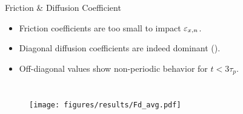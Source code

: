 \begin{frame}{Friction \& Diffusion Coefficient}
    \begin{itemize}
        \itemVspace
        \item Friction coefficients are too small to impact $\varepsilon_{x,n}$.
        \item Diagonal diffusion coefficients are indeed dominant (\cite{manheimer1997langevin}).
        \item Off-diagonal values show non-periodic behavior for $t < 3\tau_p$.
    \end{itemize}

    \begin{columns}[1.1\textwidth]
            \vspace{0.50cm}
            \begin{figure}
                \begin{center}
                    \texttt{[image: figures/results/Fd\_avg.pdf]}
                \end{center}
                \label{fig:convergence_DFd_VICO_FD}
            \end{figure}
            \begin{figure}
                \begin{center}
                \end{center}
                \label{fig:convergence_DFd_VICO_spectral}
            \end{figure}
    \end{columns}

\end{frame}

